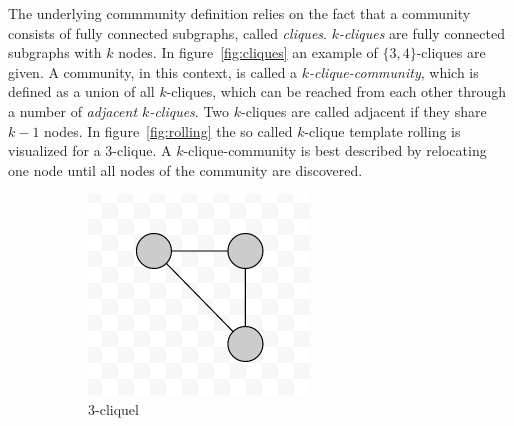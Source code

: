 \documentclass[runningheads,a4paper]{llncs}
\begin{document}
The underlying commmunity definition relies on the fact that a community consists of fully connected subgraphs, called \emph{cliques}.
\emph{$k$-cliques} are fully connected subgraphs with $k$ nodes.
In figure~\ref{fig:cliques} an example of $\{3,4\}$-cliques are given.
A community, in this context, is called a \emph{$k$-clique-community}, which is defined as a union of all $k$-cliques, which can be reached from each other through a number of \emph{adjacent $k$-cliques}.
Two $k$-cliques are called adjacent if they share $k-1$ nodes.
In figure~\ref{fig:rolling} the so called $k$-clique template rolling is visualized for a $3$-clique.
A $k$-clique-community is best described by relocating one node until all nodes of the community are discovered.

\begin{figure}
    \centering
    \begin{subfigure}[b]{0.3\textwidth}
        \includegraphics[width=\textwidth]{3-clique}
        \caption{3-cliquel}
        \label{fig:3clique}
    \end{subfigure}
    ~ %
    \begin{subfigure}[b]{0.3\textwidth}

\end{subfigure}
\end{figure}
\end{document}
